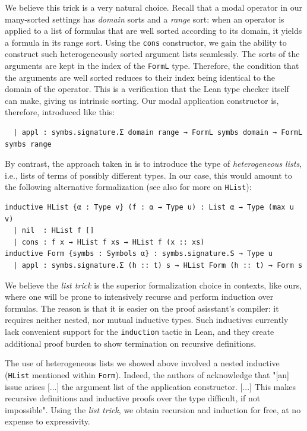 \documentclass{easychair}
\theoremstyle{remark}
\begin{document}
We believe this trick is a very natural choice. Recall that a modal operator in our many-sorted settings has \textit{domain} sorts and a \textit{range} sort: when an operator is applied to a list of formulas that are well sorted according to its domain, it yields a formula in its range sort. Using the \lstinline{cons} constructor, we gain the ability to construct such heterogeneously sorted argument lists seamlessly. The sorts of the arguments are kept in the index of the \lstinline{FormL} type. Therefore, the condition that the arguments are well sorted reduces to their index being identical to the domain of the operator. This is a verification that the Lean type checker itself can make, giving us intrinsic sorting. Our modal application constructor is, therefore, introduced like this:

\begin{lstlisting}
  | appl : symbs.signature.Σ domain range → FormL symbs domain → FormL symbs range
\end{lstlisting}

By contrast, the approach taken in \cite{gunther2018formalization, depmatching} is to introduce the type of \textit{heterogeneous lists}, i.e., lists of terms of possibly different types. In our case, this would amount to the following alternative formalization (see also \cite{Chlipala2013-ot} for more on \lstinline{HList}):
\begin{lstlisting}
inductive HList {α : Type v} (f : α → Type u) : List α → Type (max u v)
  | nil  : HList f []
  | cons : f x → HList f xs → HList f (x :: xs)
inductive Form {symbs : Symbols α} : symbs.signature.S → Type u
  | appl : symbs.signature.Σ (h :: t) s → HList Form (h :: t) → Form s
\end{lstlisting}

We believe the \textit{list trick} is the superior formalization choice in contexts, like ours, where one will be prone to intensively recurse and perform induction over formulas. The reason is that it is easier on the proof asisstant's compiler: it requires neither nested, nor mutual inductive types. Such inductives currently lack convenient support for the \lstinline{induction} tactic in Lean, and they create additional proof burden to show termination on recursive definitions.

The use of heterogeneous lists we showed above involved a nested inductive (\lstinline{HList} mentioned within \lstinline{Form}). Indeed, the authors of \cite{depmatching} acknowledge that "[an] issue arises [...] the argument
list of the application constructor. [...] This makes recursive definitions and inductive proofs over the type difficult, if not impossible". Using the \textit{list trick}, we obtain recursion and induction for free, at no expense to expressivity.
\end{document}
